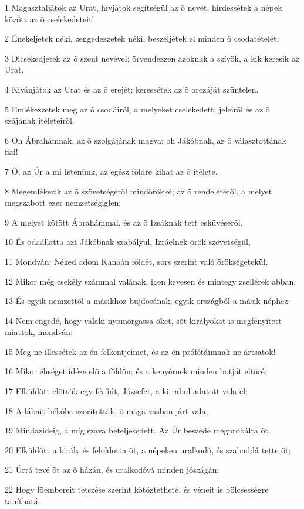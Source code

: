 \par 1 Magasztaljátok az Urat, hívjátok segítségül az õ nevét, hirdessétek a népek között az õ cselekedeteit!
\par 2 Énekeljetek néki, zengedezzetek néki, beszéljétek el minden õ csodatételét.
\par 3 Dicsekedjetek az õ szent nevével; örvendezzen azoknak a szívök, a kik keresik az Urat.
\par 4 Kivánjátok az Urat és az õ erejét; keressétek az õ orczáját szüntelen.
\par 5 Emlékezzetek meg az õ csodáiról, a melyeket cselekedett; jeleirõl és az õ szájának ítéleteirõl.
\par 6 Oh Ábrahámnak, az õ szolgájának magva; oh Jákóbnak, az õ választottának fiai!
\par 7 Õ, az Úr a mi Istenünk, az egész földre kihat az õ ítélete.
\par 8 Megemlékezik az õ szövetségérõl mindörökké; az õ rendeletérõl, a melyet megszabott ezer nemzetségiglen;
\par 9 A melyet kötött Ábrahámmal, és az õ Izsáknak tett esküvésérõl.
\par 10 És odaállatta azt Jákóbnak szabályul, Izráelnek örök szövetségül,
\par 11 Mondván: Néked adom Kanaán földét, sors szerint való örökségetekül.
\par 12 Mikor még csekély számmal valának, igen kevesen és mintegy zsellérek abban,
\par 13 És egyik nemzettõl a másikhoz bujdosának, egyik országból a másik néphez:
\par 14 Nem engedé, hogy valaki nyomorgassa õket, sõt királyokat is megfenyített miattok, mondván:
\par 15 Meg ne illessétek az én felkentjeimet, és az én prófétáimnak ne ártsatok!
\par 16 Mikor éhséget idéze elõ a földön; és a kenyérnek minden botját eltöré,
\par 17 Elküldött elõttük egy férfiút, Józsefet, a ki rabul adatott vala el;
\par 18 A lábait békóba szorították, õ maga vasban járt vala,
\par 19 Mindazideig, a míg szava beteljesedett. Az Úr beszéde megpróbálta õt.
\par 20 Elküldött a király és feloldotta õt, a népeken uralkodó, és szabaddá tette õt;
\par 21 Úrrá tevé õt az õ házán, és uralkodóvá minden jószágán;
\par 22 Hogy fõembereit tetszése szerint kötöztetheté, és véneit is bölcsességre taníthatá.
